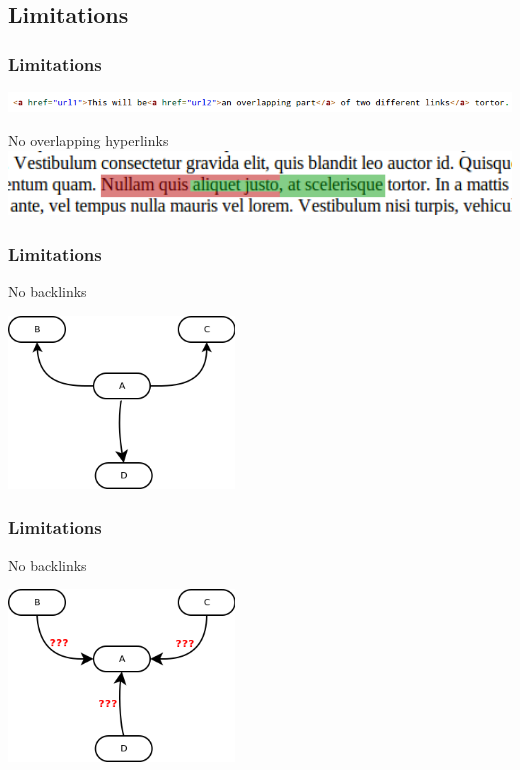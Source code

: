 \subsection{Limitations} \label{sub:Limitations}



\begin{frame}
\frametitle{Limitations}
	\begin{block}{}
		\includegraphics[width=1\textwidth]{./images/overlappingLinks2.png}
	\end{block}
	\begin{block}{No overlapping hyperlinks}
		\includegraphics[width=1\textwidth]{./images/overlappingLinks.png}
	\end{block}
\end{frame}

\begin{frame}
\frametitle{Limitations}
	\begin{block}{No backlinks}
		\begin{center}
			\includegraphics[width=0.45\textwidth]{./images/outgoing.png}
		\end{center}
	\end{block}
\end{frame}

\begin{frame}
\frametitle{Limitations}
	\begin{block}{No backlinks}
		\begin{center}
			\includegraphics[width=0.45\textwidth]{./images/incoming.png}
		\end{center}
	\end{block}
\end{frame}

